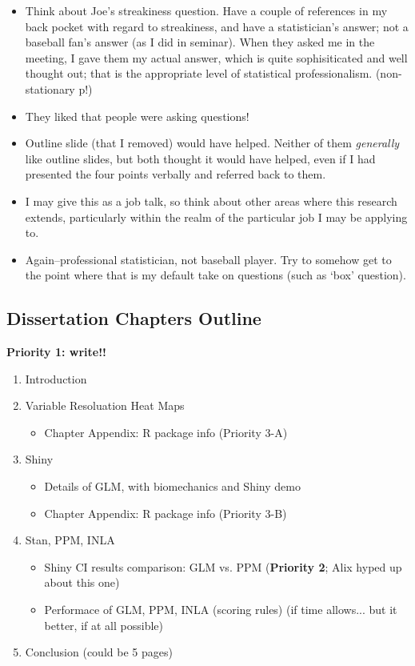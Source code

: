 \documentclass{article}
\begin{document}
\begin{itemize}
\begin{itemize}
  \item Think about Joe's streakiness question. Have a couple of references in my back pocket with regard to streakiness, and have a statistician's answer; not a baseball fan's answer (as I did in seminar). When they asked me in the meeting, I gave them my actual answer, which is quite sophisiticated and well thought out; that is the appropriate level of statistical professionalism. (non-stationary p!)
  \item They liked that people were asking questions!
  \item Outline slide (that I removed) would have helped. Neither of them {\it generally} like outline slides, but both thought it would have helped, even if I had presented the four points verbally and referred back to them.
  \item I may give this as a job talk, so think about other areas where this research extends, particularly within the realm of the particular job I may be applying to.
  \item Again--professional statistician, not baseball player. Try to somehow get to the point where that is my default take on questions (such as `box' question).
  \end{itemize}
\end{itemize}

\subsection*{Dissertation Chapters Outline}
{\bf Priority 1: write!!}
\begin{enumerate}
\item Introduction
\item Variable Resoluation Heat Maps
  \begin{itemize}
  \item Chapter Appendix: R package info (Priority 3-A)
  \end{itemize}
\item Shiny
  \begin{itemize}
  \item Details of GLM, with biomechanics and Shiny demo
  \item Chapter Appendix: R package info (Priority 3-B)
  \end{itemize}
\item Stan, PPM, INLA
  \begin{itemize}
  \item Shiny CI results comparison: GLM vs. PPM ({\bf Priority 2}; Alix hyped up about this one)
  \item Performace of GLM, PPM, INLA (scoring rules) (if time allows... but it better, if at all possible)
  \end{itemize}
\item Conclusion (could be 5 pages)
\end{enumerate}
\end{document}
